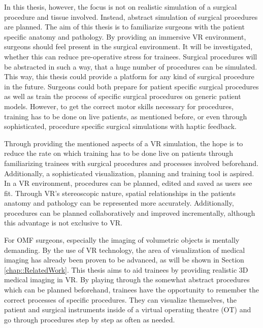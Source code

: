 In this thesis, however, the focus is not on realistic simulation of a surgical procedure and tissue involved.
Instead, abstract simulation of surgical procedures are planned.
The aim of this thesis is to familiarize surgeons with the patient specific anatomy and pathology.
By providing an immersive VR environment, surgeons should feel present in the surgical environment.
It will be investigated, whether this can reduce pre-operative stress for trainees.
Surgical procedures will be abstracted in such a way, that a huge number of procedures can be simulated.
This way, this thesis could provide a platform for any kind of surgical procedure in the future. 
Surgeons could both prepare for patient specific surgical procedures as well as train the process of specific surgical procedures on generic patient models.  
However, to get the correct motor skills necessary for procedures, training has to be done on live patients, as mentioned before, or even through sophisticated, procedure specific surgical 
simulations with haptic feedback.

Through providing the mentioned aspects of a VR simulation, the hope is to reduce the rate on which training has to be done live on patients through familiarizing trainees with 
surgical procedures and processes involved beforehand.
Additionally, a sophisticated visualization, planning and training tool is aspired.
\\ In a VR environment, procedures can be planned, edited and saved as users see fit.
Through VR's stereoscopic nature, spatial relationships in the patients anatomy and pathology can be represented more accurately.
Additionally, procedures can be planned collaboratively and improved incrementally, although this advantage is not exclusive to VR.

For OMF surgeons, especially the imaging of volumetric objects is mentally demanding. 
By the use of VR technology, the area of visualization of medical imaging has already been proven to be advanced, as will be shown in Section \ref{chap::RelatedWork}.
This thesis aims to aid trainees by providing realistic 3D medical imaging in VR.
By playing through the somewhat abstract procedures which can be planned beforehand, trainees have the opportunity to remember the correct processes of specific procedures.
They can visualize themselves, the patient and surgical instruments inside of a virtual operating theatre (OT) and go through procedures step by step as often as needed.